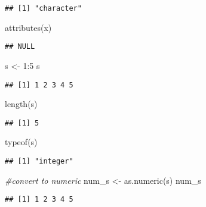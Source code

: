 \documentclass[
]{article}
\newenvironment{Shaded}{\begin{snugshade}}{\end{snugshade}}
\newcommand{\CommentTok}[1]{\textcolor[rgb]{0.56,0.35,0.01}{\textit{#1}}}
\newcommand{\DecValTok}[1]{\textcolor[rgb]{0.00,0.00,0.81}{#1}}
\newcommand{\FunctionTok}[1]{\textcolor[rgb]{0.00,0.00,0.00}{#1}}
\newcommand{\NormalTok}[1]{#1}
\newcommand{\OtherTok}[1]{\textcolor[rgb]{0.56,0.35,0.01}{#1}}
\newcommand{\SpecialCharTok}[1]{\textcolor[rgb]{0.00,0.00,0.00}{#1}}
\begin{document}
\begin{verbatim}
## [1] "character"
\end{verbatim}

\begin{Shaded}
\begin{Highlighting}[]
\FunctionTok{attributes}\NormalTok{(x)}
\end{Highlighting}
\end{Shaded}

\begin{verbatim}
## NULL
\end{verbatim}

\begin{Shaded}
\begin{Highlighting}[]
\NormalTok{s }\OtherTok{\textless{}{-}} \DecValTok{1}\SpecialCharTok{:}\DecValTok{5}
\NormalTok{s}
\end{Highlighting}
\end{Shaded}

\begin{verbatim}
## [1] 1 2 3 4 5
\end{verbatim}

\begin{Shaded}
\begin{Highlighting}[]
\FunctionTok{length}\NormalTok{(s)}
\end{Highlighting}
\end{Shaded}

\begin{verbatim}
## [1] 5
\end{verbatim}

\begin{Shaded}
\begin{Highlighting}[]
\FunctionTok{typeof}\NormalTok{(s)}
\end{Highlighting}
\end{Shaded}

\begin{verbatim}
## [1] "integer"
\end{verbatim}

\begin{Shaded}
\begin{Highlighting}[]
\CommentTok{\#convert to numeric}
\NormalTok{num\_s }\OtherTok{\textless{}{-}} \FunctionTok{as.numeric}\NormalTok{(s)}
\NormalTok{num\_s}
\end{Highlighting}
\end{Shaded}

\begin{verbatim}
## [1] 1 2 3 4 5
\end{verbatim}
\end{document}
